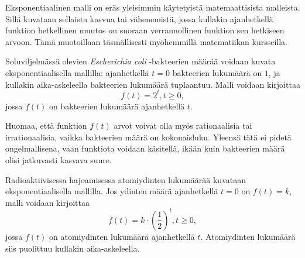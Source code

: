 Eksponentiaalinen malli on eräs yleisimmin käytetyistä matemaattisista
malleista. Sillä kuvataan sellaista kasvua tai vähenemistä, jossa
kullakin ajanhetkellä funktion hetkellinen muutos on suoraan
verrannollinen funktion sen hetkiseen arvoon. Tämä muotoillaan
täsmällisesti myöhemmillä matematiikan kursseilla.

\begin{esimerkki}
Soluviljelmässä olevien \emph{Escherichia coli} -bakteerien
määrää voidaan kuvata eksponentiaalisella mallilla: ajanhetkellä
$t = 0$ bakteerien lukumäärä on $1$, ja kullakin aika-askeleella
bakteerien lukumäärä tuplaantuu. Malli voidaan kirjoittaa
\[
f(t) = 2^t, t \ge 0,
\]
jossa $f(t)$ on bakteerien lukumäärä ajanhetkellä $t$.

Huomaa, että funktion $f(t)$ arvot voivat
olla myös rationaalisia tai irrationaalisia, vaikka bakteerien
määrä on kokonaisluku. Yleensä tätä ei pidetä ongelmallisena,
vaan funktiota voidaan käsitellä, ikään kuin bakteerien määrä
olisi jatkuvasti kasvava suure.
\end{esimerkki}

\begin{esimerkki}
Radioaktiivisessa hajoamisessa atomiydinten lukumäärää kuvataan
eksponentiaalisella mallilla. Jos ydinten määrä ajanhetkellä
$t = 0$ on $f(t) = k$, malli voidaan kirjoittaa
\[
f(t) = k \cdot \left( \frac{1}{2} \right)^t, t \ge 0,
\]
jossa $f(t)$ on atomiydinten lukumäärä ajanhetkellä $t$. Atomiydinten
lukumäärä siis puolittuu kullakin aika-askeleella.
\end{esimerkki}

